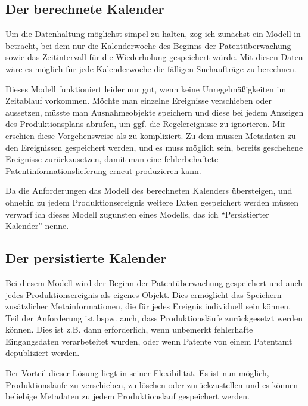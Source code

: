 \subsection{Der berechnete Kalender}
\label{ch:Lösungsansätze:Produktionsplan:BerechneterKalender}

Um die Datenhaltung möglichst simpel zu halten, zog ich zunächst ein Modell in
betracht, bei dem nur die Kalenderwoche des Beginns der Patentüberwachung sowie
das Zeitintervall für die Wiederholung gespeichert würde. Mit diesen Daten wäre
es möglich für jede Kalenderwoche die fälligen Suchaufträge zu berechnen.

Dieses Modell funktioniert leider nur gut, wenn keine Unregelmäßigkeiten im
Zeitablauf vorkommen. Möchte man einzelne Ereignisse verschieben oder aussetzen,
müsste man Ausnahmeobjekte speichern und diese bei jedem Anzeigen des
Produktionsplans abrufen, um ggf. die Regelereignisse zu ignorieren. Mir
erschien diese Vorgehensweise als zu kompliziert. Zu dem müssen Metadaten zu den
Ereignissen gespeichert werden, und es muss möglich sein, bereits geschehene
Ereignisse zurückzusetzen, damit man eine fehlerbehaftete
Patentinformationslieferung erneut produzieren kann.

Da die Anforderungen das Modell des berechneten Kalenders übersteigen, und
ohnehin zu jedem Produktionsereignis weitere Daten gespeichert werden müssen
verwarf ich dieses Modell zugunsten eines Modells, das ich "`Persistierter
Kalender"' nenne.

\subsection{Der persistierte Kalender}
\label{ch:Lösungsansätze:Produktionsplan:PersistierteKalender}

Bei diesem Modell wird der Beginn der Patentüberwachung gespeichert und auch
jedes Produktionsereignis als eigenes Objekt. Dies ermöglicht das
Speichern zusätzlicher Metainformationen, die für jedes Ereignis individuell
sein können. Teil der Anforderung ist bspw. auch, dass Produktionsläufe
zurückgesetzt werden können. Dies ist z.B. dann erforderlich, wenn unbemerkt
fehlerhafte Eingangsdaten verarbeteitet wurden, oder wenn Patente von einem
Patentamt depubliziert werden.

Der Vorteil dieser Lösung liegt in seiner Flexibilität. Es ist nun möglich,
Produktionsläufe zu verschieben, zu löschen oder zurückzustellen und es können
beliebige Metadaten zu jedem Produktionslauf gespeichert werden.

